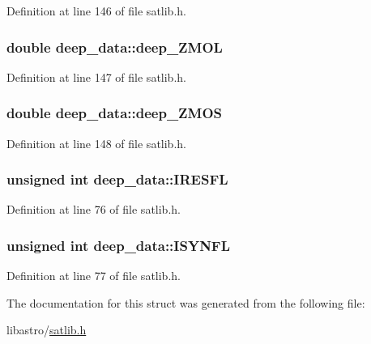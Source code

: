 Definition at line 146 of file satlib.\-h.

\hypertarget{structdeep__data_a5a6e082590579cfe2583194a031b37a0}{
\subsubsection[{deep\-\_\-\-Z\-M\-O\-L}]{\setlength{\rightskip}{0pt plus 5cm}double deep\-\_\-data\-::deep\-\_\-\-Z\-M\-O\-L}}\label{structdeep__data_a5a6e082590579cfe2583194a031b37a0}


Definition at line 147 of file satlib.\-h.

\hypertarget{structdeep__data_af22009584dacba5c4a3bf97d94692731}{
\subsubsection[{deep\-\_\-\-Z\-M\-O\-S}]{\setlength{\rightskip}{0pt plus 5cm}double deep\-\_\-data\-::deep\-\_\-\-Z\-M\-O\-S}}\label{structdeep__data_af22009584dacba5c4a3bf97d94692731}


Definition at line 148 of file satlib.\-h.

\hypertarget{structdeep__data_aa483e28efccb3251ed4ab9a8acc87cf1}{
\subsubsection[{I\-R\-E\-S\-F\-L}]{\setlength{\rightskip}{0pt plus 5cm}unsigned int deep\-\_\-data\-::\-I\-R\-E\-S\-F\-L}}\label{structdeep__data_aa483e28efccb3251ed4ab9a8acc87cf1}


Definition at line 76 of file satlib.\-h.

\hypertarget{structdeep__data_a50c7c2c3f446f082e85caeebe42b6334}{
\subsubsection[{I\-S\-Y\-N\-F\-L}]{\setlength{\rightskip}{0pt plus 5cm}unsigned int deep\-\_\-data\-::\-I\-S\-Y\-N\-F\-L}}\label{structdeep__data_a50c7c2c3f446f082e85caeebe42b6334}


Definition at line 77 of file satlib.\-h.



The documentation for this struct was generated from the following file\-:\begin{DoxyCompactItemize}
\item 
libastro/\hyperlink{satlib_8h}{satlib.\-h}\end{DoxyCompactItemize}
